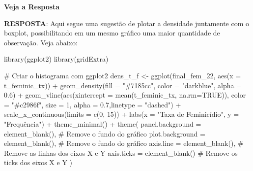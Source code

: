 \documentclass[
  letterpaper,
  DIV=11,
  numbers=noendperiod]{scrreprt}
\newenvironment{Shaded}{\begin{snugshade}}{\end{snugshade}}
\newcommand{\AttributeTok}[1]{\textcolor[rgb]{0.40,0.45,0.13}{#1}}
\newcommand{\CommentTok}[1]{\textcolor[rgb]{0.37,0.37,0.37}{#1}}
\newcommand{\ConstantTok}[1]{\textcolor[rgb]{0.56,0.35,0.01}{#1}}
\newcommand{\DecValTok}[1]{\textcolor[rgb]{0.68,0.00,0.00}{#1}}
\newcommand{\FloatTok}[1]{\textcolor[rgb]{0.68,0.00,0.00}{#1}}
\newcommand{\FunctionTok}[1]{\textcolor[rgb]{0.28,0.35,0.67}{#1}}
\newcommand{\NormalTok}[1]{\textcolor[rgb]{0.00,0.23,0.31}{#1}}
\newcommand{\OtherTok}[1]{\textcolor[rgb]{0.00,0.23,0.31}{#1}}
\newcommand{\SpecialCharTok}[1]{\textcolor[rgb]{0.37,0.37,0.37}{#1}}
\newcommand{\StringTok}[1]{\textcolor[rgb]{0.13,0.47,0.30}{#1}}
\begin{document}
\begin{tcolorbox}[enhanced jigsaw, colframe=quarto-callout-warning-color-frame, opacityback=0, breakable, leftrule=.75mm, toprule=.15mm, arc=.35mm, rightrule=.15mm, bottomrule=.15mm, left=2mm, colback=white]
\begin{minipage}[t]{5.5mm}
\textcolor{quarto-callout-warning-color}{\faExclamationTriangle}
\end{minipage}%
\begin{minipage}[t]{\textwidth - 5.5mm}

\vspace{-3mm}\textbf{Veja a Resposta}\vspace{3mm}

\textbf{RESPOSTA}: Aqui segue uma sugestão de plotar a densidade
juntamente com o boxplot, possibilitando em um mesmo gráfico uma maior
quantidade de observação. Veja abaixo:

\begin{Shaded}
\begin{Highlighting}[]
\FunctionTok{library}\NormalTok{(ggplot2)}
\FunctionTok{library}\NormalTok{(gridExtra)}

\CommentTok{\# Criar o histograma com ggplot2}
\NormalTok{dens\_t\_f }\OtherTok{\textless{}{-}} \FunctionTok{ggplot}\NormalTok{(final\_fem\_22, }\FunctionTok{aes}\NormalTok{(}\AttributeTok{x =}\NormalTok{ t\_feminic\_tx)) }\SpecialCharTok{+}
  \FunctionTok{geom\_density}\NormalTok{(}\AttributeTok{fill =} \StringTok{"\#7185cc"}\NormalTok{, }\AttributeTok{color =} \StringTok{"darkblue"}\NormalTok{, }\AttributeTok{alpha =} \FloatTok{0.6}\NormalTok{) }\SpecialCharTok{+}
  \FunctionTok{geom\_vline}\NormalTok{(}\FunctionTok{aes}\NormalTok{(}\AttributeTok{xintercept =} \FunctionTok{mean}\NormalTok{(t\_feminic\_tx, }\AttributeTok{na.rm=}\ConstantTok{TRUE}\NormalTok{)), }\AttributeTok{color =} \StringTok{"\#c2986f"}\NormalTok{, }\AttributeTok{size =} \DecValTok{1}\NormalTok{, }\AttributeTok{alpha =} \FloatTok{0.7}\NormalTok{,}\AttributeTok{linetype =} \StringTok{"dashed"}\NormalTok{) }\SpecialCharTok{+}  
  \FunctionTok{scale\_x\_continuous}\NormalTok{(}\AttributeTok{limits =} \FunctionTok{c}\NormalTok{(}\DecValTok{0}\NormalTok{, }\DecValTok{15}\NormalTok{)) }\SpecialCharTok{+}
  \FunctionTok{labs}\NormalTok{(}\AttributeTok{x =} \StringTok{"Taxa de Feminicídio"}\NormalTok{, }\AttributeTok{y =} \StringTok{"Frequência"}\NormalTok{) }\SpecialCharTok{+}
  \FunctionTok{theme\_minimal}\NormalTok{()  }\SpecialCharTok{+}
  \FunctionTok{theme}\NormalTok{(}
    \AttributeTok{panel.background =} \FunctionTok{element\_blank}\NormalTok{(),  }\CommentTok{\# Remove o fundo do gráfico}
    \AttributeTok{plot.background =} \FunctionTok{element\_blank}\NormalTok{(),   }\CommentTok{\# Remove o fundo do gráfico}
    \AttributeTok{axis.line =} \FunctionTok{element\_blank}\NormalTok{(),         }\CommentTok{\# Remove as linhas dos eixos X e Y}
    \AttributeTok{axis.ticks =} \FunctionTok{element\_blank}\NormalTok{()        }\CommentTok{\# Remove os ticks dos eixos X e Y}
\NormalTok{  )}



\end{Highlighting}
\end{Shaded}
\end{minipage}
\end{tcolorbox}
\end{document}
